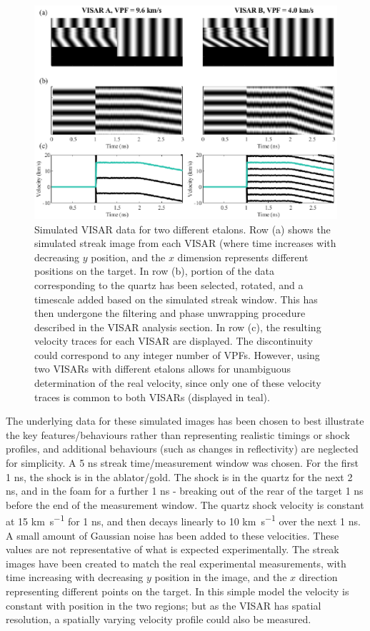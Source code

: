 \begin{figure}
\includegraphics[width=1.0\textwidth]{figures/Experiment/VISARToy.eps}%
\caption{\label{fig:VISARToy} Simulated VISAR data for two different etalons. Row (a) shows the simulated streak image from each VISAR (where time increases with decreasing $y$ position, and the $x$ dimension represents different positions on the target. In row (b), portion of the data corresponding to the quartz has been selected, rotated, and a timescale added based on the simulated streak window. This has then undergone the filtering and phase unwrapping procedure described in the VISAR analysis section. In row (c), the resulting velocity traces for each VISAR are displayed. The discontinuity could correspond to any integer number of VPFs. However, using two VISARs with different etalons allows for unambiguous determination of the real velocity, since only one of these velocity traces is common to both VISARs (displayed in teal).}
\end{figure}

The underlying data for these simulated images has been chosen to best illustrate the key features/behaviours rather than representing realistic timings or shock profiles, and additional behaviours (such as changes in reflectivity) are neglected for simplicity. A 5 \unit{\nano\second} streak time/measurement window was chosen. For the first 1 \unit{\nano\second}, the shock is in the ablator/gold. The shock is in the quartz for the next 2 \unit{\nano\second}, and in the foam for a further 1 \unit{\nano\second} - breaking out of the rear of the target 1 \unit{\nano\second} before the end of the measurement window. The quartz shock velocity is constant at 15 \unit{\kilo\meter\per\second} for 1 \unit{\nano\second}, and then decays linearly to 10 \unit{\kilo\meter\per\second} over the next 1 \unit{\nano\second}. A small amount of Gaussian noise has been added to these velocities. These values are not representative of what is expected experimentally. The streak images have been created to match the real experimental measurements, with time increasing with decreasing $y$ position in the image, and the $x$ direction representing different points on the target. In this simple model the velocity is constant with position in the two regions; but as the VISAR has spatial resolution, a spatially varying velocity profile could also be measured.


